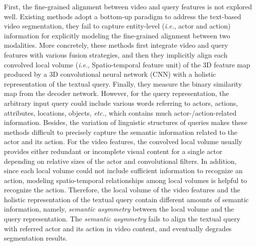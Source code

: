 \documentclass[journal]{IEEEtran}
\begin{document}
First, the fine-grained alignment between video and query features is not explored well. Existing methods adopt a bottom-up paradigm to address the text-based video segmentation, they fail to capture entity-level (\emph{i.e.}, actor and action) information for explicitly modeling the fine-grained alignment between two modalities. More concretely, these methods first integrate video and query features with various fusion strategies, and then they implicitly align each convolved local volume (\emph{i.e.}, Spatio-temporal feature unit) of the 3D feature map produced by a 3D convolutional neural network (CNN) with a holistic representation of the textual query. Finally, they measure the binary similarity map from the decoder network. However, for the query representation, the arbitrary input query could include various words referring to actors, actions, attributes, locations, objects, \emph{etc.}, which contains much actor-/action-related information. Besides, the variation of linguistic structures of queries makes these methods difficult to precisely capture the semantic information related to the actor and its action. For the video features, the convolved local volume usually provides either redundant or incomplete visual content for a single actor depending on relative sizes of the actor and convolutional filters. In addition, since each local volume could not include sufficient information to recognize an action, modeling spatio-temporal relationships among local volumes \cite{he2019stnet, nonlocal2018} is helpful to recognize the action. Therefore, the local volume of the video features and the holistic representation of the textual query contain different amounts of semantic information, namely, \emph{semantic asymmetry} between the local volume and the query representation. The \emph{semantic asymmetry} fails to align the textual query with referred actor and its action in video content, and eventually degrades segmentation results.
\end{document}
